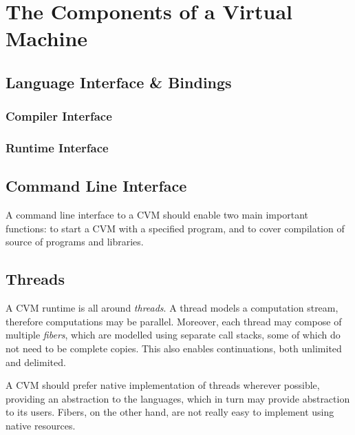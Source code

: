 \FloatBarrier







\chapter{The Components of a Virtual Machine}

\section{Language Interface \& Bindings}
\label{sec:language-bindings}

\subsection{Compiler Interface}

\subsection{Runtime Interface}

\section{Command Line Interface}

A command line interface to a CVM should enable two main important functions: to start a CVM with a specified program, and to cover compilation of source of programs and libraries. 






\section{Threads}

A CVM runtime is all around {\em threads}. A thread models a computation stream, therefore computations may be parallel. Moreover, each thread may compose of multiple {\em fibers}, which are modelled using separate call stacks, some of which do not need to be complete copies. This also enables continuations, both unlimited and delimited. 

A CVM should prefer native implementation of threads wherever possible, providing an abstraction to the languages, which in turn may provide abstraction to its users. Fibers, on the other hand, are not really easy to implement using native resources. 

